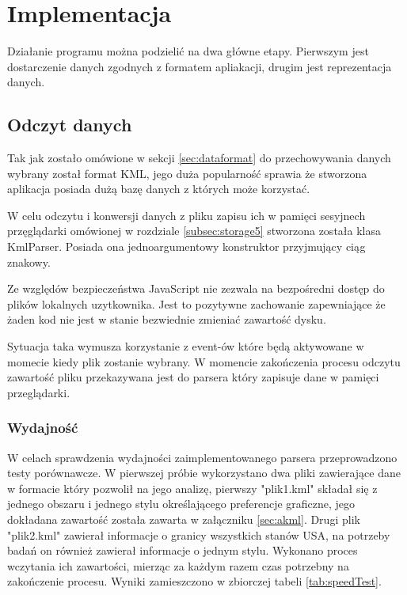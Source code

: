 ﻿\chapter{Implementacja}
\label{cha:implementacja}

Działanie programu można podzielić na dwa główne etapy. Pierwszym jest dostarczenie danych zgodnych z formatem apliakacji, drugim jest reprezentacja danych.

\section{Odczyt danych}
\label{sec:idata}

Tak jak zostało omówione w sekcji \ref{sec:dataformat} do przechowywania danych wybrany został format KML, jego duża popularność sprawia że stworzona aplikacja posiada dużą bazę danych z których może korzystać.

W celu odczytu i konwersji danych z pliku zapisu ich w pamięci sesyjnech przęglądarki omówionej w rozdziale \ref{subsec:storage5} stworzona została klasa KmlParser. Posiada ona jednoargumentowy konstruktor przyjmujący ciąg znakowy.

Ze względów bezpieczeństwa JavaScript nie zezwala na bezpośredni dostęp do plików lokalnych uzytkownika. Jest to pozytywne zachowanie zapewniające że żaden kod nie jest w stanie bezwiednie zmieniać zawartość dysku.

Sytuacja taka wymusza korzystanie z event-ów które będą aktywowane w momecie kiedy plik zostanie wybrany. W momencie zakończenia procesu odczytu zawartość pliku przekazywana jest do parsera który zapisuje dane w pamięci przeglądarki.

\subsection{Wydajność}
\label{subsec:wydajnosc}

W celach sprawdzenia wydajności zaimplementowanego parsera przeprowadzono testy porównawcze. W pierwszej próbie wykorzystano dwa pliki zawierające dane w formacie który pozwolił na jego analizę, pierwszy "plik1.kml" składał się z jednego obszaru i jednego stylu określającego preferencje graficzne, jego dokładana zawartość została zawarta w załączniku \ref{sec:akml}. Drugi plik "plik2.kml" zawierał informacje o granicy wszystkich stanów USA, na potrzeby badań on również zawierał informacje o jednym stylu.
Wykonano proces wczytania ich zawartości, mierząc za każdym razem czas potrzebny na zakończenie procesu. Wyniki zamieszczono w zbiorczej tabeli \ref{tab:speedTest}.

